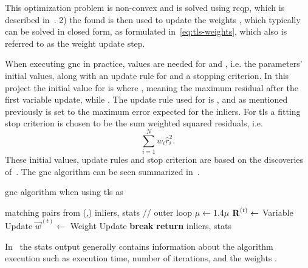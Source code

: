 This optimization problem is non-convex and is solved using \gls{rcqp}, which is described in~. 2) the found \tf[R]{}{} is then used to update the weights , which typically can be solved in closed form, as formulated in~\eqref{eq:tls-weights}, which also is referred to as the weight update step. \medskip

When executing \gls{gnc} in practice, values are needed for  and , i.e. the parameters' initial values, along with an update rule for \mvar{\mu} and a stopping criterion. 
In this project the initial value for \mvar{\mu} is  where , meaning the maximum residual after the first variable update, while . The update rule used for \mvar{\mu} is \mvar{\mu\leftarrow 1.4\mu}, and as mentioned previously  is set to the maximum error expected for the inliers. For \gls{tls} a fitting stop criterion is chosen to be the sum weighted squared residuals, i.e.
\begin{equation}
	\sum^N_{i=1}w_i\hat{r}_i^2.
\end{equation}
These initial values, update rules and stop criterion are based on the discoveries of~\cite{graduated-non-convexity-for-robust-spatial-perception:-from-non-minimal-solvers-to-global-outlier-rejection}. The \gls{gnc} algorithm can be seen summarized in~.

\begin{algorithm}
	\algrenewcommand{}
	\algrenewcommand{}
	\caption{\gls{gnc} algorithm when using \gls{tls} as \mvar{\rho(\cdot)}}
	\label{alg:gnc}
	\begin{algorithmic}[1]
		\Require matching pairs from (,) 
		\Ensure inliers, stats
		 // outer loop
			\State $\mu\gets 1.4\mu$
			\State $\bm{\mathrm{R}}^{(t)} \gets $ Variable Update
			\State $\vec{w}^{(t)} \gets $ Weight Update
				\State \textbf{break}
			\EndIf
		\EndWhile
		\State \textbf{return} inliers, stats
	\end{algorithmic}
\end{algorithm}

In~ the stats output generally contains information about the algorithm execution such as execution time, number of iterations, and the weights .

